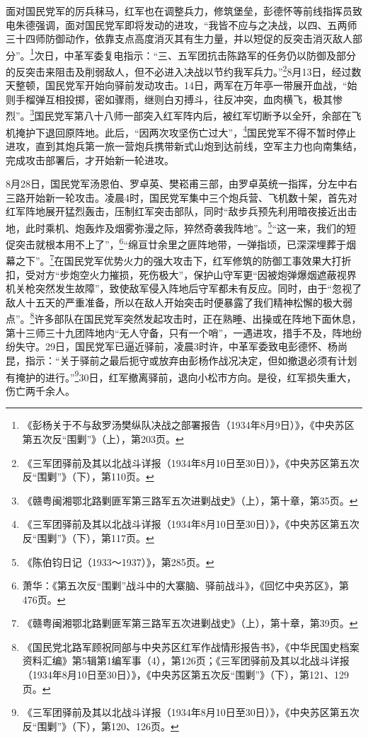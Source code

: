 面对国民党军的厉兵秣马，红军也在调整兵力，修筑堡垒，彭德怀等前线指挥员致电朱德强调，面对国民党军即将发动的进攻，“我皆不应与之决战，以四、五两师三十四师防御动作，依靠支点高度消灭其有生力量，并以短促的反突击消灭敌人部分”。\footnote{《彭杨关于不与敌罗汤樊纵队决战之部署报告（1934年8月9日）》，《中央苏区第五次反“围剿”》（上），第203页。}次日，中革军委复电指示：“三、五军团抗击陈路军的任务仍以防御及部分的反突击来阻击及削弱敌人，但不必进入决战以节约我军兵力。”\footnote{《三军团驿前及其以北战斗详报（1934年8月10日至30日）》，《中央苏区第五次反“围剿”》（下），第110页。}8月13日，经过数天整顿，国民党军开始向驿前发动攻击。14日，两军在万年亭一带展开血战，“始则手榴弹互相投掷，密如骤雨，继则白刃搏斗，往反冲突，血肉横飞，极其惨烈”。\footnote{《赣粤闽湘鄂北路剿匪军第三路军五次进剿战史》（上），第十章，第35页。}国民党军第八十八师一部突入红军阵内后，被红军切断予以全歼，余部在飞机掩护下退回原阵地。此后，“因两次攻坚伤亡过大”，\footnote{《三军团驿前及其以北战斗详报（1934年8月10日至30日）》，《中央苏区第五次反“围剿”》（下），第117页。}国民党军不得不暂时停止进攻，直到其炮兵第一旅一营炮兵携带新式山炮到达前线，空军主力也向南集结，完成攻击部署后，才开始新一轮进攻。


8月28日，国民党军汤恩伯、罗卓英、樊崧甫三部，由罗卓英统一指挥，分左中右三路开始新一轮攻击。凌晨4时，国民党军集中三个炮兵营、飞机数十架，首先对红军阵地展开猛烈轰击，压制红军突击部队，同时“敌步兵预先利用暗夜接近出击地，此时乘机、炮轰炸及烟雾弥漫之际，猝然奇袭我阵地”。\footnote{《陈伯钧日记（1933～1937）》，第285页。}“这一来，我们的短促突击就根本用不上了”，\footnote{萧华：《第五次反“围剿”战斗中的大寨脑、驿前战斗》，《回忆中央苏区》，第476页。}“绵亘廿余里之匪阵地带，一弹指顷，已深深埋葬于烟幕之下”。\footnote{《赣粤闽湘鄂北路剿匪军第三路军五次进剿战史》（上），第十章，第39页。}在国民党军优势火力的强大攻击下，红军修筑的防御工事效果大打折扣，受对方“步炮空火力摧损，死伤极大”，保护山守军更“因被炮弹爆烟遮蔽视界机关枪突然发生故障”，致使敌军侵入阵地后守军都未有反应。同时，由于“忽视了敌人十五天的严重准备，所以在敌人开始突击时便暴露了我们精神松懈的极大弱点”。\footnote{《国民党北路军顾祝同部与中央苏区红军作战情形报告书》，《中华民国史档案资料汇编》第5辑第1编军事（4），第126页；《三军团驿前及其以北战斗详报（1934年8月10日至30日）》，《中央苏区第五次反“围剿”》（下），第121、129页。}许多部队在国民党军突然发起攻击时，正在熟睡、出操或在阵地下面休息，第十三师三十九团阵地内“无人守备，只有一个哨”，一遇进攻，措手不及，阵地纷纷失守。29日，国民党军已逼近驿前，凌晨3时许，中革军委致电彭德怀、杨尚昆，指示：“关于驿前之最后扼守或放弃由彭杨作战况决定，但如撤退必须有计划有掩护的进行。”\footnote{《三军团驿前及其以北战斗详报（1934年8月10日至30日）》，《中央苏区第五次反“围剿”》（下），第120、126页。}30日，红军撤离驿前，退向小松市方向。是役，红军损失重大，伤亡两千余人。


